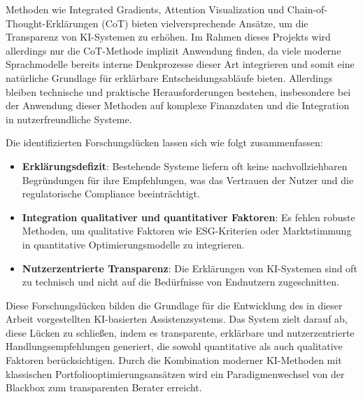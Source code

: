   Methoden wie Integrated Gradients, Attention Visualization und Chain-of-Thought-Erklärungen (\acs{CoT}) bieten vielversprechende Ansätze, um die Transparenz von KI-Systemen zu erhöhen.
  Im Rahmen dieses Projekts wird allerdings nur die \acs{CoT}-Methode implizit Anwendung finden, da viele moderne Sprachmodelle bereits interne Denkprozesse dieser Art integrieren und somit eine natürliche Grundlage für erklärbare Entscheidungsabläufe bieten.
  Allerdings bleiben technische und praktische Herausforderungen bestehen, insbesondere bei der Anwendung dieser Methoden auf komplexe Finanzdaten und die Integration in nutzerfreundliche Systeme.

  Die identifizierten Forschungslücken lassen sich wie folgt zusammenfassen:

  \begin{itemize}
  \item \textbf{Erklärungsdefizit}: Bestehende Systeme liefern oft keine nachvollziehbaren Begründungen für ihre Empfehlungen, was das Vertrauen der Nutzer und die regulatorische Compliance beeinträchtigt.
  \item \textbf{Integration qualitativer und quantitativer Faktoren}: Es fehlen robuste Methoden, um qualitative Faktoren wie \acs{ESG}-Kriterien oder Marktstimmung in quantitative Optimierungsmodelle zu integrieren.
  \item \textbf{Nutzerzentrierte Transparenz}: Die Erklärungen von \acs{KI}-Systemen sind oft zu technisch und nicht auf die Bedürfnisse von Endnutzern zugeschnitten.
  \end{itemize}

  Diese Forschungslücken bilden die Grundlage für die Entwicklung des in dieser Arbeit vorgestellten \acs{KI}-basierten Assistenzsystems.
  Das System zielt darauf ab, diese Lücken zu schließen, indem es transparente, erklärbare und nutzerzentrierte Handlungsempfehlungen generiert, die sowohl quantitative als auch qualitative Faktoren berücksichtigen.
  Durch die Kombination moderner \acs{KI}-Methoden mit klassischen Portfoliooptimierungsansätzen wird ein Paradigmenwechsel von der Blackbox zum transparenten Berater erreicht.



